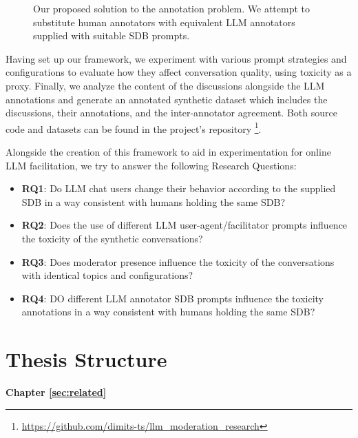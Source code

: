 \begin{figure}
	\centering
	
	\caption{Our proposed solution to the annotation problem. We attempt to substitute human annotators with equivalent LLM annotators supplied with suitable \ac{SDB} prompts.}
	\label{fig::goals_4}
\end{figure}


Having set up our framework, we experiment with various prompt strategies and configurations to evaluate how they affect conversation quality, using toxicity as a proxy. Finally, we analyze the content of the discussions alongside the LLM annotations and generate an annotated synthetic dataset which includes the discussions, their annotations, and the inter-annotator agreement. Both source code and datasets can be found in the project's repository \footnote{\url{https://github.com/dimits-ts/llm_moderation_research}}.

Alongside the creation of this framework to aid in experimentation for online LLM facilitation, we try to answer the following Research Questions:

\begin{itemize}
	\item \textbf{RQ1}: Do LLM chat users change their behavior according to the supplied \ac{SDB} in a way consistent with humans holding the same \ac{SDB}?
	
	\item \textbf{RQ2}: Does the use of different LLM user-agent/facilitator prompts influence the toxicity of the synthetic conversations?
	
	\item \textbf{RQ3}: Does moderator presence influence the toxicity of the conversations with identical topics and configurations?
	
	\item \textbf{RQ4}: DO different LLM annotator \ac{SDB} prompts influence the toxicity annotations in a way consistent with humans holding the same \ac{SDB}?
\end{itemize}



\section{Thesis Structure}
\label{sec:intro:structure}

\textbf{Chapter \ref{sec:related}} \\[0.2em]

